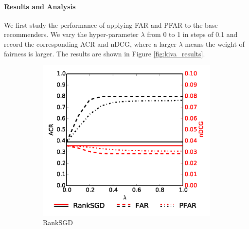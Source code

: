 \paragraph{\textbf{Results and Analysis}}

We first study the performance of applying FAR and PFAR to the base recommenders. We vary the hyper-parameter $\lambda$ from 0 to 1 in steps of 0.1 and record the corresponding ACR and nDCG, where a larger $\lambda$ means the weight of fairness is larger. The results are shown in Figure \ref{fig:kiva_results}. 

\begin{figure}
	\centering
	\begin{subfigure}{0.49\columnwidth} %
		\includegraphics[width=\textwidth]{imgs/far/ranksgd.png}
		\caption{RankSGD \cite{pmlr-v18-jahrer12b}} %
	\end{subfigure}
	\begin{subfigure}{0.49\columnwidth} %

\end{subfigure}
\end{figure}
